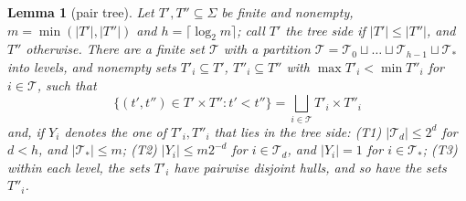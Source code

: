 \documentclass[11pt]{amsart}
\newtheorem{lemma}[theorem]{Lemma}
\theoremstyle{definition}
\theoremstyle{remark}
\numberwithin{equation}{section}
\newcommand{\abs}[1]{\lvert #1\rvert}
\theoremstyle{plain}
\theoremstyle{definition}
\theoremstyle{plain}
\begin{document}
\begin{lemma}[pair tree]\label{ord:lem:pair-tree}
Let $T',T''\subseteq\Sigma$ be finite and nonempty, $m=\min(\abs{T'},\abs{T''})$ and $h=\lceil\log_2m\rceil$; call $T'$
the \emph{tree side} if $\abs{T'}\le\abs{T''}$, and $T''$ otherwise. There are a finite set $\mathcal T$ with a partition
$\mathcal T=\mathcal T_0\sqcup\dots\sqcup\mathcal T_{h-1}\sqcup\mathcal T_\ast$ into \emph{levels}, and nonempty sets
$T'_i\subseteq T'$, $T''_i\subseteq T''$ with $\max T'_i<\min T''_i$ for $i\in\mathcal T$, such that
\begin{equation}\label{ord:eq:pair-partition}
 \{(t',t'')\in T'\times T'':t'<t''\}=\bigsqcup_{i\in\mathcal T}T'_i\times T''_i
\end{equation}
and, if $Y_i$ denotes the one of $T'_i,T''_i$ that lies in the tree side:
\textup{(T1)} $\abs{\mathcal T_d}\le2^d$ for $d<h$, and $\abs{\mathcal T_\ast}\le m$;
\textup{(T2)} $\abs{Y_i}\le m2^{-d}$ for $i\in\mathcal T_d$, and $\abs{Y_i}=1$ for $i\in\mathcal T_\ast$;
\textup{(T3)} within each level, the sets $T'_i$ have pairwise disjoint hulls, and so have the sets $T''_i$.
\end{lemma}
\end{document}
